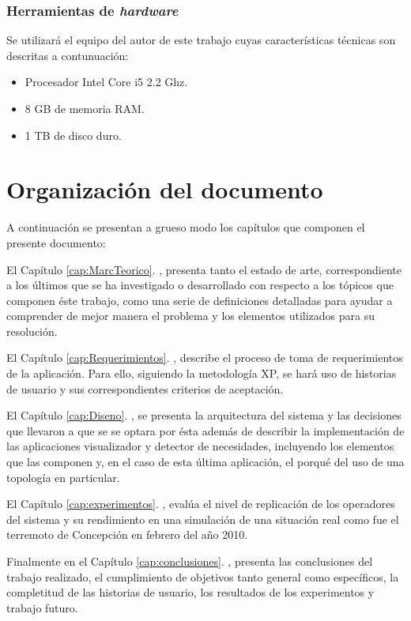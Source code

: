 \subsubsection{Herramientas de \textit{hardware}}
\label{subsubsec:HerrHardw}

Se utilizará el equipo del autor de este trabajo cuyas características técnicas son descritas a contunuación:
\begin{itemize}
\item Procesador Intel Core i5 2.2 Ghz.
\item 8 GB de memoria RAM.
\item 1 TB de disco duro.
\end{itemize}

\section{Organización del documento}
\label{intro:organizacion}

A continuación se presentan a grueso modo los capítulos que componen el presente documento:

El Capítulo \ref{cap:MarcTeorico}. , presenta tanto el estado de arte, correspondiente a los últimos que se ha investigado o desarrollado con respecto a los tópicos que componen éste trabajo, como una serie de definiciones detalladas para ayudar a comprender de mejor manera el problema y los elementos utilizados para su resolución.

El Capítulo \ref{cap:Requerimientos}. , describe el proceso de toma de requerimientos de la aplicación. Para ello, siguiendo la metodología XP, se hará uso de historias de usuario y sus correspondientes criterios de aceptación.

El Capítulo \ref{cap:Diseno}. , se presenta la arquitectura del sistema y las decisiones que llevaron a que se se optara por ésta además de describir la implementación de las aplicaciones visualizador y detector de necesidades, incluyendo los elementos que las componen y, en el caso de esta última aplicación, el porqué del uso de una topología en particular.

El Capítulo \ref{cap:experimentos}. , evalúa el nivel de replicación de los operadores del sistema y su rendimiento en una simulación de una situación real como fue el terremoto de Concepción en febrero del año 2010.

Finalmente en el Capítulo \ref{cap:conclusiones}. , presenta las conclusiones del trabajo realizado, el cumplimiento de objetivos tanto general como específicos, la completitud de las historias de usuario, los resultados de los experimentos y trabajo futuro.